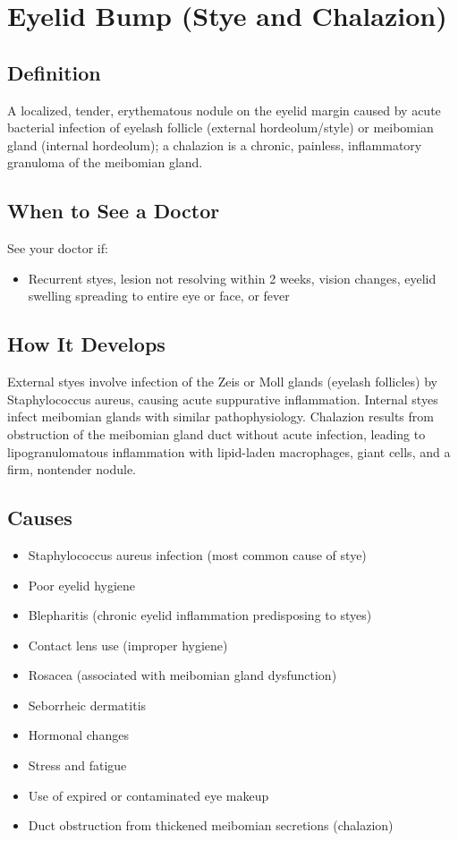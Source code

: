 \chapter{Eyelid Bump (Stye and Chalazion)}

\section*{Definition}
A localized, tender, erythematous nodule on the eyelid margin caused by acute bacterial infection of eyelash follicle (external hordeolum/style) or meibomian gland (internal hordeolum); a chalazion is a chronic, painless, inflammatory granuloma of the meibomian gland.

\section*{When to See a Doctor}
See your doctor if:
\begin{itemize}
  \item Recurrent styes, lesion not resolving within 2 weeks, vision changes, eyelid swelling spreading to entire eye or face, or fever
\end{itemize}

\section*{How It Develops}
External styes involve infection of the Zeis or Moll glands (eyelash follicles) by Staphylococcus aureus, causing acute suppurative inflammation. Internal styes infect meibomian glands with similar pathophysiology. Chalazion results from obstruction of the meibomian gland duct without acute infection, leading to lipogranulomatous inflammation with lipid-laden macrophages, giant cells, and a firm, nontender nodule.

\section*{Causes}
\begin{itemize}
  \item Staphylococcus aureus infection (most common cause of stye)
  \item Poor eyelid hygiene
  \item Blepharitis (chronic eyelid inflammation predisposing to styes)
  \item Contact lens use (improper hygiene)
  \item Rosacea (associated with meibomian gland dysfunction)
  \item Seborrheic dermatitis
  \item Hormonal changes
  \item Stress and fatigue
  \item Use of expired or contaminated eye makeup
  \item Duct obstruction from thickened meibomian secretions (chalazion)
\end{itemize}

